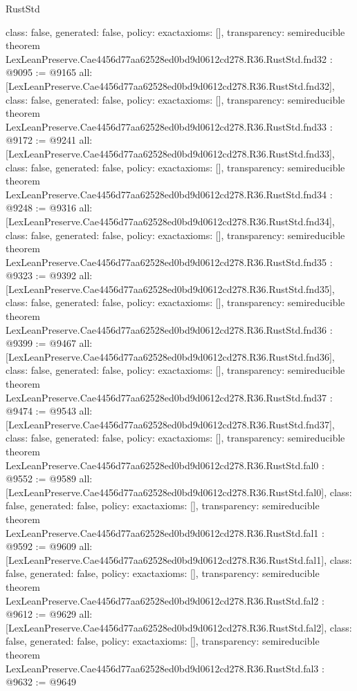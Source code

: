 \begin{lexlean}{RustStd}
\begin{coremodule}
{  class: false,
  generated: false,
  policy: exact{axioms: []},
  transparency: semireducible
}
theorem LexLeanPreserve.Cae4456d77aa62528ed0bd9d0612cd278.R36.RustStd.fnd32 : @9095 := @9165 {
  all: [LexLeanPreserve.Cae4456d77aa62528ed0bd9d0612cd278.R36.RustStd.fnd32],
  class: false,
  generated: false,
  policy: exact{axioms: []},
  transparency: semireducible
}
theorem LexLeanPreserve.Cae4456d77aa62528ed0bd9d0612cd278.R36.RustStd.fnd33 : @9172 := @9241 {
  all: [LexLeanPreserve.Cae4456d77aa62528ed0bd9d0612cd278.R36.RustStd.fnd33],
  class: false,
  generated: false,
  policy: exact{axioms: []},
  transparency: semireducible
}
theorem LexLeanPreserve.Cae4456d77aa62528ed0bd9d0612cd278.R36.RustStd.fnd34 : @9248 := @9316 {
  all: [LexLeanPreserve.Cae4456d77aa62528ed0bd9d0612cd278.R36.RustStd.fnd34],
  class: false,
  generated: false,
  policy: exact{axioms: []},
  transparency: semireducible
}
theorem LexLeanPreserve.Cae4456d77aa62528ed0bd9d0612cd278.R36.RustStd.fnd35 : @9323 := @9392 {
  all: [LexLeanPreserve.Cae4456d77aa62528ed0bd9d0612cd278.R36.RustStd.fnd35],
  class: false,
  generated: false,
  policy: exact{axioms: []},
  transparency: semireducible
}
theorem LexLeanPreserve.Cae4456d77aa62528ed0bd9d0612cd278.R36.RustStd.fnd36 : @9399 := @9467 {
  all: [LexLeanPreserve.Cae4456d77aa62528ed0bd9d0612cd278.R36.RustStd.fnd36],
  class: false,
  generated: false,
  policy: exact{axioms: []},
  transparency: semireducible
}
theorem LexLeanPreserve.Cae4456d77aa62528ed0bd9d0612cd278.R36.RustStd.fnd37 : @9474 := @9543 {
  all: [LexLeanPreserve.Cae4456d77aa62528ed0bd9d0612cd278.R36.RustStd.fnd37],
  class: false,
  generated: false,
  policy: exact{axioms: []},
  transparency: semireducible
}
theorem LexLeanPreserve.Cae4456d77aa62528ed0bd9d0612cd278.R36.RustStd.fal0 : @9552 := @9589 {
  all: [LexLeanPreserve.Cae4456d77aa62528ed0bd9d0612cd278.R36.RustStd.fal0],
  class: false,
  generated: false,
  policy: exact{axioms: []},
  transparency: semireducible
}
theorem LexLeanPreserve.Cae4456d77aa62528ed0bd9d0612cd278.R36.RustStd.fal1 : @9592 := @9609 {
  all: [LexLeanPreserve.Cae4456d77aa62528ed0bd9d0612cd278.R36.RustStd.fal1],
  class: false,
  generated: false,
  policy: exact{axioms: []},
  transparency: semireducible
}
theorem LexLeanPreserve.Cae4456d77aa62528ed0bd9d0612cd278.R36.RustStd.fal2 : @9612 := @9629 {
  all: [LexLeanPreserve.Cae4456d77aa62528ed0bd9d0612cd278.R36.RustStd.fal2],
  class: false,
  generated: false,
  policy: exact{axioms: []},
  transparency: semireducible
}
theorem LexLeanPreserve.Cae4456d77aa62528ed0bd9d0612cd278.R36.RustStd.fal3 : @9632 := @9649 {
}
\end{coremodule}
\end{lexlean}
